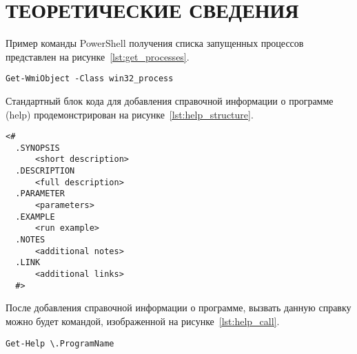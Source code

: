 \section{ТЕОРЕТИЧЕСКИЕ СВЕДЕНИЯ}

Пример команды PowerShell получения списка запущенных процессов
представлен на рисунке~\ref{lst:get_processes}.

\begin{lstlisting}[caption=Команда получения списка запущенных процессов, label=lst:get_processes]
  Get-WmiObject -Class win32_process
\end{lstlisting}

Стандартный блок кода для добавления справочной информации о программе (help) продемонстрирован
на рисунке~\ref{lst:help_structure}.

\begin{lstlisting}[caption=Стандартная форма добавления справки к программе, label=lst:help_structure]
  <#
  .SYNOPSIS
      <short description>
  .DESCRIPTION
      <full description>
  .PARAMETER
      <parameters>
  .EXAMPLE
      <run example>
  .NOTES
      <additional notes>
  .LINK
      <additional links>
  #>
\end{lstlisting}

После добавления справочной информации о программе,
вызвать данную справку можно будет командой,
изображенной на рисунке~\ref{lst:help_call}.
\begin{lstlisting}[caption=Пример вызова справки к программе, label=lst:help_call]
  Get-Help \.ProgramName
\end{lstlisting}

\newpage
